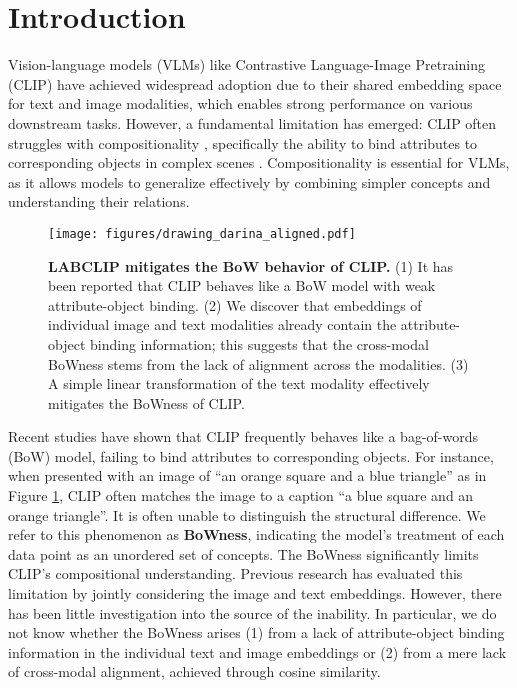 \section{Introduction}

Vision-language models (VLMs) like Contrastive Language-Image Pretraining (CLIP) \cite{radford2021learning} have achieved widespread adoption due to their shared embedding space for text and image modalities, which enables strong performance on various downstream tasks. However, a fundamental limitation has emerged: CLIP often struggles with compositionality \cite{thrush2022winoground}, specifically the ability to bind attributes to corresponding objects in complex scenes \cite{Tang2023, Lewis2024, Yuksekgonul2023}. Compositionality is essential for VLMs, as it allows models to generalize effectively by combining simpler concepts and understanding their relations.
\begin{figure}[h]
  \centering
   \texttt{[image: figures/drawing\_darina\_aligned.pdf]}
   \caption{\small\textbf{LABCLIP mitigates the BoW behavior of CLIP.} (1) It has been reported that CLIP behaves like a BoW model with weak attribute-object binding. (2) We discover that embeddings of individual image and text modalities already contain the attribute-object binding information; this suggests that the cross-modal BoWness stems from the lack of alignment across the modalities. (3) A simple linear transformation of the text modality effectively mitigates the BoWness of CLIP.}   
    \label{fig:bow_illustration}
\end{figure}

Recent studies \cite{Yuksekgonul2023} have shown that CLIP frequently behaves like a bag-of-words (BoW) model, failing to bind attributes to corresponding objects. For instance, when presented with an image of ``an orange square and a blue triangle'' as in Figure \ref{fig:bow_illustration}, CLIP often matches the image to a caption ``a blue square and an orange triangle''. It is often unable to distinguish the structural difference. We refer to this phenomenon as \textbf{BoWness}, indicating the model's treatment of each data point as an unordered set of concepts. The BoWness significantly limits CLIP's compositional understanding. Previous research has evaluated this limitation by jointly considering the image and text embeddings. However, there has been little investigation into the source of the inability. In particular, we do not know whether the BoWness arises (1) from a lack of attribute-object binding information in the individual text and image embeddings or (2) from a mere lack of cross-modal alignment, achieved through cosine similarity.




